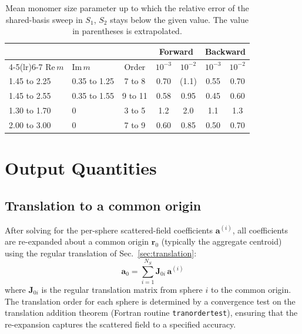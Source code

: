 \documentclass[11pt,a4paper]{article}
\renewcommand{\arraystretch}{1.6}
\begin{document}
\begin{table}[htbp]
\caption{Mean monomer size parameter up to which the relative error of the shared-basis sweep in $S_1$, $S_2$ stays below the given value. The value in parentheses is extrapolated.}
\label{tab:shared-basis-limits}
\centering
\renewcommand{\arraystretch}{1.2}
\begin{tabular}{@{} llccccc @{}}
\toprule
 & & & \multicolumn{2}{c}{Forward} & \multicolumn{2}{c}{Backward} \\
\cmidrule(lr){4-5}\cmidrule(lr){6-7}
$\mathrm{Re}\,m$ & $\mathrm{Im}\,m$ & Order & $10^{-3}$ & $10^{-2}$ & $10^{-3}$ & $10^{-2}$ \\
\midrule
1.45 to 2.25 & 0.35 to 1.25 & 7 to 8  & 0.70 & (1.1) & 0.55 & 0.70 \\
1.45 to 2.55 & 0.35 to 1.55 & 9 to 11 & 0.58 & 0.95  & 0.45 & 0.60 \\
1.30 to 1.70 & 0            & 3 to 5  & 1.2  & 2.0   & 1.1  & 1.3  \\
2.00 to 3.00 & 0            & 7 to 9  & 0.60 & 0.85  & 0.50 & 0.70 \\
\bottomrule
\end{tabular}
\end{table}

\section{Output Quantities}
\label{sec:output}

\subsection{Translation to a common origin}
\label{sec:common-origin}

After solving for the per-sphere scattered-field coefficients $\bm{a}^{(i)}$, all coefficients are re-expanded about a common origin $\bm{r}_0$ (typically the aggregate centroid) using the regular translation of Sec.~\ref{sec:translation}:
\begin{equation}
  \bm{a}_0 = \sum_{i=1}^{N_S} \mathbf{J}_{0i}\,\bm{a}^{(i)}
  \label{eq:common-origin}
\end{equation}
where $\mathbf{J}_{0i}$ is the regular translation matrix from sphere $i$ to the common origin.
The translation order for each sphere is determined by a convergence test on the translation addition theorem (Fortran routine \texttt{tranordertest}), ensuring that the re-expansion captures the scattered field to a specified accuracy.
\end{document}
